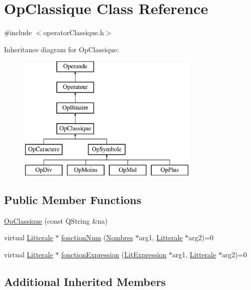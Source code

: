 \hypertarget{class_op_classique}{}\section{Op\+Classique Class Reference}
\label{class_op_classique}


{\ttfamily \#include $<$operator\+Classique.\+h$>$}

Inheritance diagram for Op\+Classique\+:\begin{figure}[H]
\begin{center}
\leavevmode
\includegraphics[height=6.000000cm]{class_op_classique}
\end{center}
\end{figure}
\subsection*{Public Member Functions}
\begin{DoxyCompactItemize}
\item 
\hyperlink{class_op_classique_a51e26a941922dfd08a8331a0c6d26adc}{Op\+Classique} (const Q\+String \&na)
\item 
virtual \hyperlink{class_litterale}{Litterale} $\ast$ \hyperlink{class_op_classique_a79bb2899f581c5773056611216a6ef7b}{fonction\+Num} (\hyperlink{class_nombres}{Nombres} $\ast$arg1, \hyperlink{class_litterale}{Litterale} $\ast$arg2)=0
\item 
virtual \hyperlink{class_litterale}{Litterale} $\ast$ \hyperlink{class_op_classique_aad9c17d4a2744d7e1afe6802fbbc3cdd}{fonction\+Expression} (\hyperlink{class_lit_expression}{Lit\+Expression} $\ast$arg1, \hyperlink{class_litterale}{Litterale} $\ast$arg2)=0
\end{DoxyCompactItemize}
\subsection*{Additional Inherited Members}


